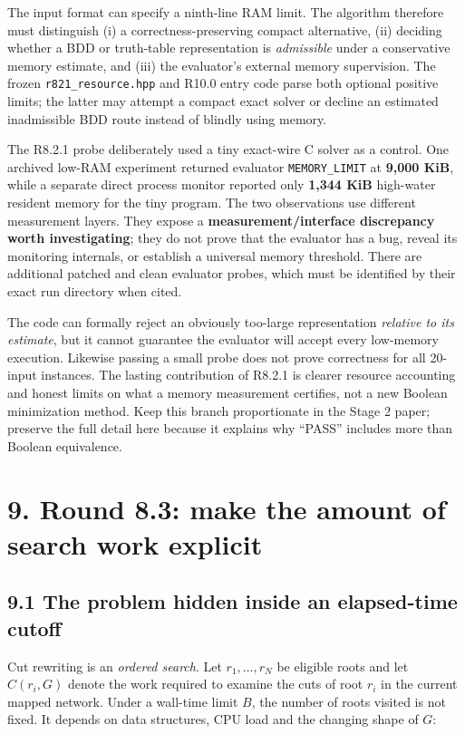 \documentclass[a4paper,10pt]{article}
\theoremstyle{definition}
\theoremstyle{remark}
\newcounter{problem}
\begin{document}
The input format can specify a ninth-line RAM limit. The algorithm therefore must distinguish (i) a correctness-preserving compact alternative, (ii) deciding whether a BDD or truth-table representation is \emph{admissible} under a conservative memory estimate, and (iii) the evaluator's external memory supervision. The frozen \texttt{r821\_resource.hpp} and R10.0 entry code parse both optional positive limits; the latter may attempt a compact exact solver or decline an estimated inadmissible BDD route instead of blindly using memory.

The R8.2.1 probe deliberately used a tiny exact-wire C solver as a control. One archived low-RAM experiment returned evaluator \texttt{MEMORY\_LIMIT} at \textbf{9,000 KiB}, while a separate direct process monitor reported only \textbf{1,344 KiB} high-water resident memory for the tiny program. The two observations use different measurement layers. They expose a \textbf{measurement/interface discrepancy worth investigating}; they do not prove that the evaluator has a bug, reveal its monitoring internals, or establish a universal memory threshold. There are additional patched and clean evaluator probes, which must be identified by their exact run directory when cited.

The code can formally reject an obviously too-large representation \emph{relative to its estimate}, but it cannot guarantee the evaluator will accept every low-memory execution. Likewise passing a small probe does not prove correctness for all 20-input instances. The lasting contribution of R8.2.1 is clearer resource accounting and honest limits on what a memory measurement certifies, not a new Boolean minimization method. Keep this branch proportionate in the Stage 2 paper; preserve the full detail here because it explains why ``PASS'' includes more than Boolean equivalence.

\section{9. Round 8.3: make the amount of search work explicit}\label{round-8.3-make-the-amount-of-search-work-explicit}

\subsection{9.1 The problem hidden inside an elapsed-time cutoff}\label{the-problem-hidden-inside-an-elapsed-time-cutoff}

Cut rewriting is an \emph{ordered search}. Let \(r_1,\ldots,r_N\) be eligible roots and let \(C(r_i,G)\) denote the work required to examine the cuts of root \(r_i\) in the current mapped network. Under a wall-time limit \(B\), the number of roots visited is not fixed. It depends on data structures, CPU load and the changing shape of \(G\):
\end{document}
